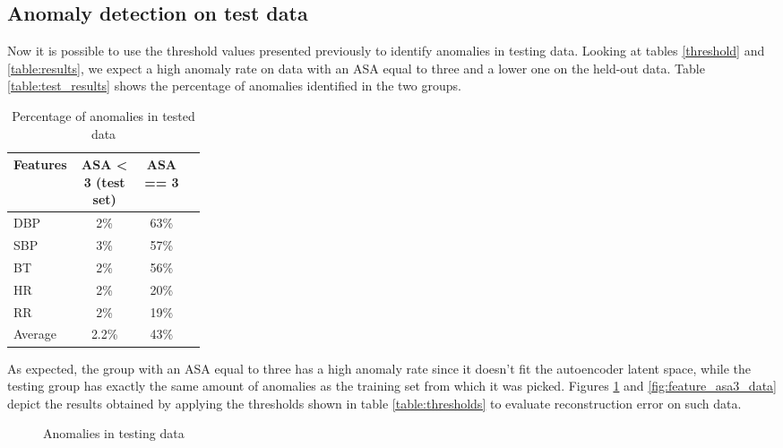 \documentclass{article}
\begin{document}
\begin{multicols*}{2}
\subsection{Anomaly detection on test data}
Now it is possible to use the threshold values presented previously to identify anomalies in testing data. Looking at tables \ref{threshold} and \ref{table:results}, we expect a high anomaly rate on data with an ASA equal to three and a lower one on the held-out data. Table \ref{table:test_results} shows the percentage of anomalies identified in the two groups.
\begin{table}[H]
	\centering
	\begin{tabular}{    p{0.25\linewidth} | c | c | c  } 
		
		Features &  ASA < 3 (test set) &  ASA == 3 \\ 
		\hline
		DBP  & 2\% & 63\% \\
		SBP & 3\% & 57\% \\
		BT & 2\% & 56\% \\
		HR & 2\% & 20\% \\
		RR & 2\% & 19\% \\
		\hline
		Average & 2.2\% & 43\%
	\end{tabular}
	\caption{Percentage of anomalies in tested data}
	\label{table:test_percentage}
\end{table}

As expected, the group with an ASA equal to three has a high anomaly rate since it doesn't fit the autoencoder latent space, while the testing group has exactly the same amount of anomalies as the training set from which it was picked.
Figures \ref{fig:feature_test_data} and \ref{fig:feature_asa3_data} depict the results obtained by applying the thresholds shown in table \ref{table:thresholds} to evaluate reconstruction error on such data.

\begin{figure}[H]
	\centering
	\caption{Anomalies in testing data}
	\label{fig:feature_test_data}
\end{figure}



\end{multicols*}
\end{document}
